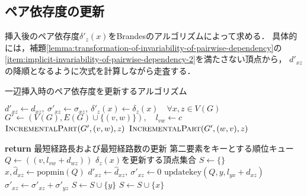 \subsection{ペア依存度の更新}
\label{subsect:update-delta-on-insert}

挿入後のペア依存度$\delta'_z(x)$をBrandesのアルゴリズムによって求める．
具体的には，補題\ref{lemma:transformation-of-invariability-of-pairwise-dependency}の
\ref{item:implicit-invariability-of-pairwise-dependency-2}を満たさない頂点から，
$d'_{xz}$の降順となるように次式を計算しながら走査する．

\begin{algorithm}[tbp]
  \caption{一辺挿入時のペア依存度を更新するアルゴリズム}
  \label{algo:incremental-algorithm}
  \begin{algorithmic}[1]\small
    \State $d'_{xz}\gets d_{xz},\:\sigma'_{xz}\gets \sigma_{xz},\:\delta'_z(x)\gets \delta_z(x)\quad\forall x,z\in V(G)$
    \State $G'\gets(V(G),E(G)\cup\{(v,w)\}),\quad l_{vw}\gets c$
    \State $\textsc{IncrementalPart}(G',(v,w),z)$
    \Else
    \State $\textsc{IncrementalPart}(G',(w,v),z)$
    \EndIf
    \EndFor
    \EndProcedure
  \end{algorithmic}
  \vspace{-.5cm}
  \begin{multicols}{2}
    \begin{algorithmic}[1]\small
      \makeatletter
      \setcounter{ALG@line}{11}
      \makeatother
      \State \textbf{return}
      \EndIf
      \State \LeftComment 最短経路長および最短経路数の更新
      \State \LeftComment 第二要素をキーとする順位キュー
      \State $Q\gets((v,l_{vw}+d_{wz}))$
      \State \LeftComment $\delta_z(x)$を更新する頂点集合
      \State $S\gets\{\}$
      \State $x,\hat{d}_{xz}\gets\mathrm{popmin}(Q)$
      \State $d'_{xz}\gets\hat{d}_{xz},\:\sigma'_{xz}\gets 0$
      \State $\mathrm{updatekey}(Q,y,l_{yx}+d_{xz})$
      \EndIf
      \State $\sigma'_{xz}\gets\sigma'_{xz}+\sigma'_{yz}$
      \EndIf
      \State $S\gets S\cup\{y\}$
      \EndIf
      \EndFor
      \State $S\gets S\cup\{x\}$
      \EndIf
      \EndWhile

\end{algorithmic}
\end{multicols}
\end{algorithm}
